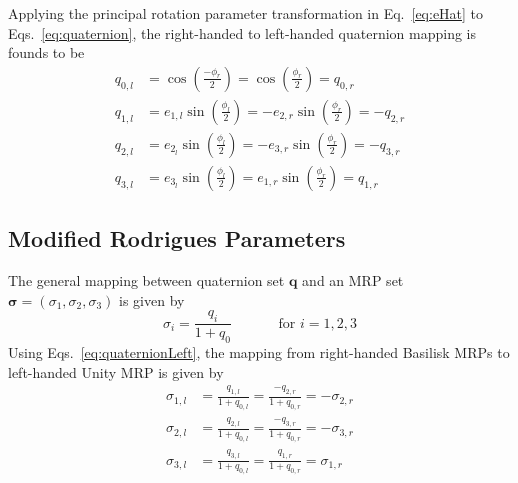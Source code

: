 \documentclass[]{BasiliskReportMemo}
\begin{document}
Applying the principal rotation parameter transformation in Eq.~\eqref{eq:eHat}  to Eqs.~\eqref{eq:quaternion}, the right-handed to left-handed quaternion mapping is founds to be
 \begin{subequations}
\label{eq:quaternionLeft}
\begin{align}
	q_{0,l} &= \cos\left( \frac{-\phi_{r}}{2} \right)  = \cos\left( \frac{\phi_{r}}{2} \right) = q_{0,r} \\
	q_{1,l} &=  e_{1,l} \sin\left( \frac{\phi_{l}}{2} \right) =   -e_{2,r} \sin\left( \frac{\phi_{r}}{2} \right)  = -q_{2,r}\\
	q_{2,l} &=  e_{2_{l}} \sin\left( \frac{\phi_{l}}{2} \right) =   -e_{3,r} \sin\left( \frac{\phi_{r}}{2} \right)  = -q_{3,r}\\
	q_{3,l} &=  e_{3_{l}} \sin\left( \frac{\phi_{l}}{2} \right) =  e_{1,r} \sin\left( \frac{\phi_{r}}{2} \right)  = q_{1,r}
\end{align}
\end{subequations}



\subsection{Modified Rodrigues Parameters}
The general mapping between quaternion set $\bm q$ and an MRP set $\bm\sigma = (\sigma_{1}, \sigma_{2}, \sigma_{3})$ is given by\cite{schaub}
\begin{equation}
	\label{eq:q2MRP}
	\sigma_{i} = \frac{q_{i}}{1+q_{0}} \quad\quad\quad \text{ for } i=1,2,3
\end{equation}
Using Eqs.~\eqref{eq:quaternionLeft}, the mapping from right-handed Basilisk MRPs to left-handed Unity MRP is given by
 \begin{subequations}
\label{eq:quaternionLeft}
	\begin{align}
		\sigma_{1,l} &= \frac{q_{1,l}}{1+q_{0,l}}  =  \frac{-q_{2,r}}{1+q_{0,r}}  = -\sigma_{2,r} \\
		\sigma_{2,l} &= \frac{q_{2,l}}{1+q_{0,l}}  =  \frac{-q_{3,r}}{1+q_{0,r}}  = -\sigma_{3,r} \\
		\sigma_{3,l} &= \frac{q_{3,l}}{1+q_{0,l}}  =  \frac{q_{1,r}}{1+q_{0,r}}  = \sigma_{1,r} 
	\end{align}
\end{subequations}





\end{document}
